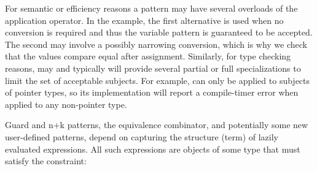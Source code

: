 \noindent
For semantic or efficiency reasons a pattern may have several overloads 
of the application operator.
In the example, the first alternative is used when no 
conversion is required and thus the variable pattern is guaranteed to be accepted.
The second may involve a possibly narrowing conversion, which is why we check 
that the values compare equal after assignment. Similarly, for type checking 
reasons,  may and typically will provide several partial 
or full specializations to limit the set of acceptable subjects. For example, 
 can only be applied to subjects 
of pointer types, so its implementation will report a compile-timer error when 
applied to any non-pointer type. 
%
%

Guard and n+k patterns, the equivalence combinator, and potentially some 
new user-defined patterns, depend on capturing the structure (term) of lazily 
evaluated expressions. All such expressions are objects of some type  
that must satisfy the  constraint:

